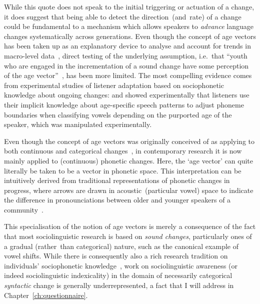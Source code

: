 While this quote does not speak to the initial triggering or actuation of a change, it does suggest that being able to detect the direction~(and~rate) of a change could be fundamental to a mechanism which allows speakers to \emph{advance} language changes systematically across generations.
Even though the concept of age vectors has been taken up as an explanatory device to analyse and account for trends in macro-level data~\citep{Labov2012,Sankoff2013,Stanford2014,Driscoll2014}, direct testing of the underlying assumption,%
i.e.~that ``youth who are engaged in the incrementation of a sound change have some perception of the age vector''~\citep[p.369]{Labov2010}, has been more limited. The most compelling evidence comes from experimental studies of listener adaptation based on sociophonetic knowledge about ongoing changes: \citet{Drager2005} and \citet{Hay2006} showed experimentally that listeners use their implicit knowledge about age-specific speech patterns to adjust phoneme boundaries when classifying vowels depending on the purported age of the speaker, which was manipulated experimentally. %

Even though the concept of age vectors was originally conceived of as applying to both continuous and categorical changes~\citep[p.346]{Labov2001}, in contemporary research it is now mainly applied to (continuous) phonetic changes. Here, the `age vector' can quite literally be taken to be a vector in phonetic space. This interpretation can be intuitively derived from traditional representations of phonetic changes in progress, where arrows are drawn in acoustic~(particular vowel) space to indicate the difference in pronounciations between older and younger speakers of a community~\citep[see e.g.][]{Labov2001}.



This specialisation of the notion of age vectors is merely a consequence of the fact that most sociolinguistic research is based on \emph{sound changes}, particularly ones of a gradual (rather~than categorical) nature, such as the canonical example of vowel shifts. 
While there is consequently also a rich research tradition on individuals' sociophonetic knowledge~\citep{Foulkes2006}, work on sociolinguistic awareness (or indeed sociolinguistic indexicality) in the domain of necessarily categorical \emph{syntactic} change is generally underrepresented, a fact that I will address in Chapter~\ref{ch:questionnaire}. %

